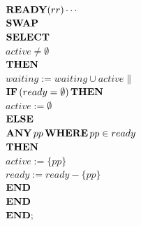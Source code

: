 \begin{slide}
\begin{center}
\begin{multicols}{2}
\begin{algo}
\>      \>      ${\bf READY}(rr) \cdots$  \\

\>      \>      ${\bf SWAP}$  \\
\>      \>      \>      ${\bf SELECT}$ \\
\>      \>      \>      \>      $active \neq \emptyset$ \\
\>      \>      \>      ${\bf THEN}$ \\
\>      \>      \>      \>      $waiting:= waiting \cup active \|$ \\ 
\>      \>      \>      \>      ${\bf IF} \, (ready=\emptyset) \, {\bf THEN}$\\
\>      \>      \>      \>      \>      $active:=\emptyset$ \\
\>      \>      \>      \>      ${\bf ELSE}$ \\
\>      \>      \>      \>      \>      ${\bf ANY}\, pp\, {\bf WHERE}\, pp
\in ready$\\
\>      \>      \>      \>      \>      ${\bf THEN}$\\
\>      \>      \>      \>      \>      \>      $active:=\{pp\}$ \\
\>      \>      \>      \>      \>      \>      $ready:=ready - \{pp\}$ \\
\>      \>      \>      \>      \>      ${\bf END}$ \\
\>      \>      \>      \>      ${\bf END}$ \\
\>      \>      \>      ${\bf END;}$
\end{algo}
\end{multicols}
\end{center}
\end{slide}


